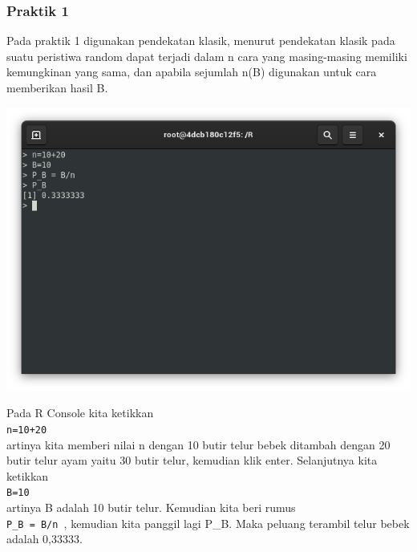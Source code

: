 \documentclass[a4paper,12pt]{article}
\begin{document}
\subsubsection{Praktik 1}
Pada praktik 1 digunakan pendekatan klasik, menurut pendekatan klasik pada suatu peristiwa random dapat terjadi dalam n cara yang masing-masing memiliki kemungkinan yang sama, dan apabila sejumlah n(B) digunakan untuk cara memberikan hasil B.
\begin{center}
	\includegraphics[scale=.5]{prak1}
\end{center}
Pada R Console kita ketikkan\\
\texttt{n=10+20}\\
artinya kita memberi nilai n dengan 10 butir telur bebek ditambah dengan 20 butir telur ayam yaitu 30 butir telur, kemudian klik enter. Selanjutnya kita ketikkan \\
\texttt{B=10}\\
artinya B adalah 10 butir telur. Kemudian kita beri rumus\\ 
\texttt{P\_B = B/n }, kemudian kita panggil lagi P\_B. Maka peluang terambil telur bebek adalah 0,33333. 
\end{document}
